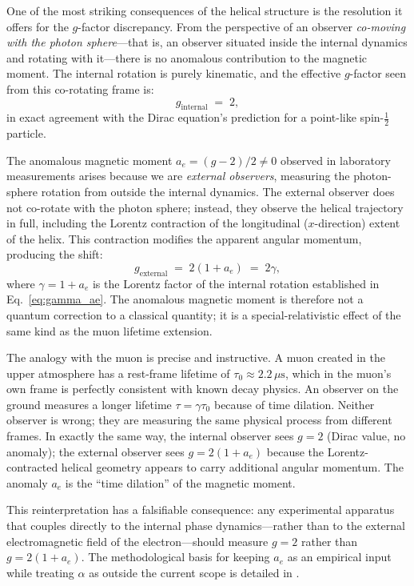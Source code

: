 \documentclass[%
 reprint, amsmath,amssymb, aps, prb, ]{revtex4-2}
\numberwithin{equation}{section}
\begin{document}
One of the most striking consequences of the helical structure is the resolution it offers for the $g$-factor discrepancy. From the perspective of an observer \emph{co-moving with the photon sphere}---that is, an observer situated inside the internal dynamics and rotating with it---there is no anomalous contribution to the magnetic moment. The internal rotation is purely kinematic, and the effective $g$-factor seen from this co-rotating frame is:
\begin{equation}
g_{\text{internal}} \;=\; 2,
\label{eq:g_internal}
\end{equation}
in exact agreement with the Dirac equation's prediction for a point-like spin-$\tfrac{1}{2}$ particle.

The anomalous magnetic moment $a_e = (g-2)/2 \neq 0$ observed in laboratory measurements arises because we are \emph{external observers}, measuring the photon-sphere rotation from outside the internal dynamics. The external observer does not co-rotate with the photon sphere; instead, they observe the helical trajectory in full, including the Lorentz contraction of the longitudinal ($x$-direction) extent of the helix. This contraction modifies the apparent angular momentum, producing the shift:
\begin{equation}
g_{\text{external}} \;=\; 2(1 + a_e) \;=\; 2\gamma,
\label{eq:g_external}
\end{equation}
where $\gamma = 1 + a_e$ is the Lorentz factor of the internal rotation established in Eq.~\eqref{eq:gamma_ae}. The anomalous magnetic moment is therefore not a quantum correction to a classical quantity; it is a special-relativistic effect of the same kind as the muon lifetime extension.

The analogy with the muon is precise and instructive. A muon created in the upper atmosphere has a rest-frame lifetime of $\tau_0 \approx 2.2\,\mu\mathrm{s}$, which in the muon's own frame is perfectly consistent with known decay physics. An observer on the ground measures a longer lifetime $\tau = \gamma\tau_0$ because of time dilation. Neither observer is wrong; they are measuring the same physical process from different frames. In exactly the same way, the internal observer sees $g=2$ (Dirac value, no anomaly); the external observer sees $g = 2(1+a_e)$ because the Lorentz-contracted helical geometry appears to carry additional angular momentum. The anomaly $a_e$ is the ``time dilation'' of the magnetic moment.

This reinterpretation has a falsifiable consequence: any experimental apparatus that couples directly to the internal phase dynamics---rather than to the external electromagnetic field of the electron---should measure $g=2$ rather than $g=2(1+a_e)$. The methodological basis for keeping $a_e$ as an empirical input while treating $\alpha$ as outside the current scope is detailed in \cite{hanamura36}.
\end{document}
